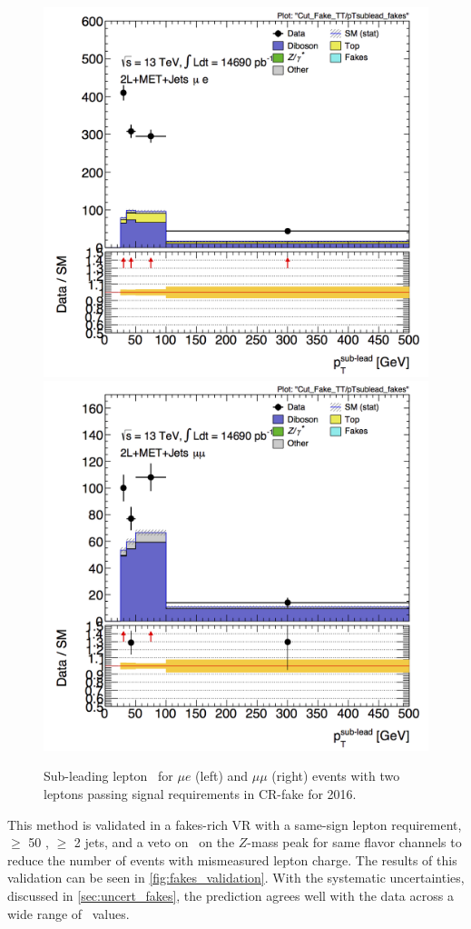 \begin{centering}
\begin{figure}[htbp]
\centering
\includegraphics[width=.48\textwidth]{figures/fakes/me-Cut_Fake_TT-pTsublead_fakes-lin_2016.png}
\includegraphics[width=.48\textwidth]{figures/fakes/mm-Cut_Fake_TT-pTsublead_fakes-lin_2016.png}
\caption{Sub-leading lepton \pT\ for $\mu e$ (left) and $\mu\mu$ (right) events with two leptons passing signal requirements in CR-fake for 2016.}
\label{fig:fake_fakereg}
\end{figure}
\end{centering}

This method is validated in a fakes-rich \ac{VR} with a same-sign lepton requirement, \met $\geq$ 50 \gev, $\geq$ 2 jets, and a veto on \mll~on the $Z$-mass peak for same flavor channels to reduce the number of \dyjets events with mismeasured lepton charge. The results of this validation can be seen in \autoref{fig:fakes_validation}. With the systematic uncertainties, discussed in \autoref{sec:uncert_fakes}, the prediction agrees well with the data across a wide range of \mll~values. 



